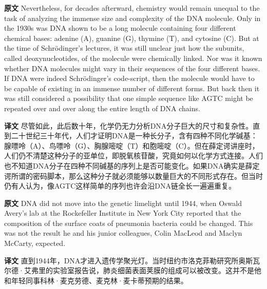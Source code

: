 \documentclass[UTF8,zihao=-4]{ctexart}
\newcommand{\BodyFont}{\fontsize{10.5pt}{15.5pt}\selectfont}
\renewenvironment{quote}{\par\noindent\begingroup\BodyFont}{\par\endgroup}
\begin{document}
\begin{quote}
\noindent\textbf{原文} Nevertheless, for decades afterward, chemistry would remain unequal to the task of analyzing the immense size and complexity of the DNA molecule. Only in the 1930s was DNA shown to be a long molecule containing four different chemical bases: adenine (A), guanine (G), thymine (T), and cytosine (C). But at the time of Schrödinger's lectures, it was still unclear just how the subunits, called deoxynucleotides, of the molecule were chemically linked. Nor was it known whether DNA molecules might vary in their sequences of the four different bases. If DNA were indeed Schrödinger's code-script, then the molecule would have to be capable of existing in an immense number of different forms. But back then it was still considered a possibility that one simple sequence like AGTC might be repeated over and over along the entire length of DNA chains.

\smallskip
\noindent\textbf{译文} 尽管如此，此后数十年，化学仍无力分析DNA分子巨大的尺寸和复杂性。直到二十世纪三十年代，人们才证明DNA是一种长分子，含有四种不同化学碱基：腺嘌呤（A）、鸟嘌呤（G）、胸腺嘧啶（T）和胞嘧啶（C）。但在薛定谔讲座时，人们仍不清楚这种分子的亚单位，即脱氧核苷酸，究竟如何以化学方式连接。人们也不知道DNA分子在四种不同碱基的序列上是否可能变化。如果DNA确实是薛定谔所谓的密码脚本，那么这种分子就必须能够以数量巨大的不同形式存在。但当时仍有人认为，像AGTC这样简单的序列也许会沿DNA链全长一遍遍重复。
\end{quote}

\begin{quote}
\noindent\textbf{原文} DNA did not move into the genetic limelight until 1944, when Oswald Avery's lab at the Rockefeller Institute in New York City reported that the composition of the surface coats of pneumonia bacteria could be changed. This was not the result he and his junior colleagues, Colin MacLeod and Maclyn McCarty, expected.

\smallskip
\noindent\textbf{译文} 直到1944年，DNA才进入遗传学聚光灯。当时纽约市洛克菲勒研究所奥斯瓦尔德·艾弗里的实验室报告说，肺炎细菌表面荚膜的组成可以被改变。这并不是他和年轻同事科林·麦克劳德、麦克林·麦卡蒂预期的结果。
\end{quote}
\end{document}
